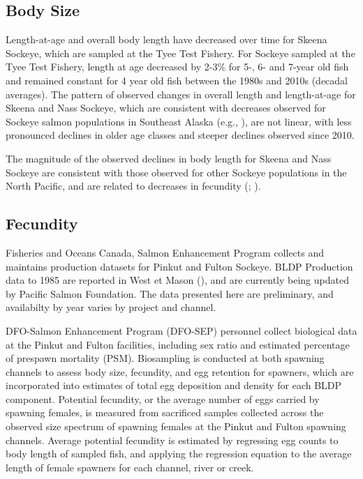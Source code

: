 \documentclass[french,11pt]{book}
\begin{document}
\subsection{Body Size}\label{body-size}

Length-at-age and overall body length have decreased over time for Skeena Sockeye, which are sampled at the Tyee Test Fishery. For Sockeye sampled at the Tyee Test Fishery, length at age decreased by 2-3\% for 5-, 6- and 7-year old fish and remained constant for 4 year old fish between the 1980s and 2010s (decadal averages). The pattern of observed changes in overall length and length-at-age for Skeena and Nass Sockeye, which are consistent with decreases observed for Sockeye salmon populations in Southeast Alaska (e.g., ), are not linear, with less pronounced declines in older age classes and steeper declines observed since 2010.

The magnitude of the observed declines in body length for Skeena and Nass Sockeye are consistent with those observed for other Sockeye populations in the North Pacific, and are related to decreases in fecundity (; ).

\subsection{Fecundity}\label{fecundity}

Fisheries and Oceans Canada, Salmon Enhancement Program collects and maintains production datasets for Pinkut and Fulton Sockeye. BLDP Production data to 1985 are reported in West et Mason (), and are currently being updated by Pacific Salmon Foundation. The data presented here are preliminary, and availabilty by year varies by project and channel.

DFO-Salmon Enhancement Program (DFO-SEP) personnel collect biological data at the Pinkut and Fulton facilities, including sex ratio and estimated percentage of prespawn mortality (PSM). Biosampling is conducted at both spawning channels to assess body size, fecundity, and egg retention for spawners, which are incorporated into estimates of total egg deposition and density for each BLDP component. Potential fecundity, or the average number of eggs carried by spawning females, is measured from sacrificed samples collected across the observed size spectrum of spawning females at the Pinkut and Fulton spawning channels. Average potential fecundity is estimated by regressing egg counts to body length of sampled fish, and applying the regression equation to the average length of female spawners for each channel, river or creek.
\end{document}
